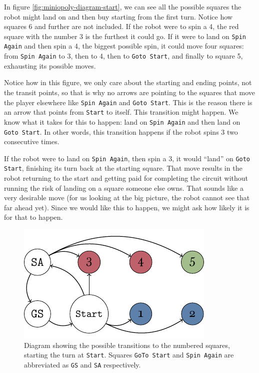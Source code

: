 In figure \ref{fig:miniopoly-diagram-start}, we can see all the possible squares
the robot might land on and then buy starting from the first turn. Notice how
squares 6 and further are not included. If the robot were to spin a 4, the red
square with the number 3 is the furthest it could go. If it were to land on
\texttt{Spin Again} and then spin a 4, the biggest possible spin, it could move
four squares: from \texttt{Spin Again} to 3, then to 4, then to \texttt{Goto
Start}, and finally to square 5, exhausting its possible moves.

Notice how in this figure, we only care about the starting and ending points,
not the transit points, so that is why no arrows are pointing to the squares
that move the player elsewhere like \texttt{Spin Again} and \texttt{Goto Start}.
This is the reason there is an arrow that points from \texttt{Start} to itself.
This transition might happen. We know what it takes for this to happen: land on
\texttt{Spin Again} and then land on \texttt{Goto Start}. In other words, this
transition happens if the robot spins 3 two consecutive times.

If the robot were to land on \texttt{Spin Again}, then spin a 3, it would
``land'' on \texttt{Goto Start}, finishing its turn back at the starting square.
That move results in the robot returning to the start and getting paid for
completing the circuit without running the risk of landing on a square someone
else owns. That sounds like a very desirable move (for us looking at the big
picture, the robot cannot see that far ahead yet). Since we would like this to
happen, we might ask how likely it is for that to happen.

\begin{figure}
\centering
\includegraphics[width=\textwidth]{img/transicion.pdf}
\caption{Diagram showing the possible transitions to the 
numbered squares, starting the turn at \texttt{Start}. Squares 
\texttt{GoTo Start} and \texttt{Spin Again} are abbreviated as 
\texttt{GS} and \texttt{SA} respectively.}
\label{fig:markov-start}
\end{figure}


